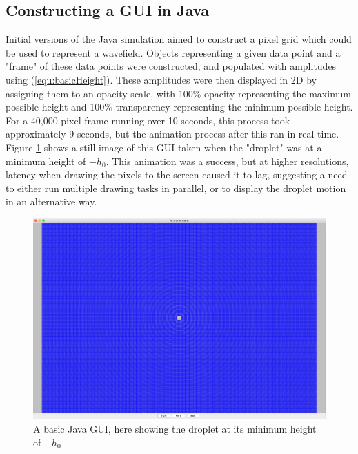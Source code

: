 \subsection{Constructing a GUI in Java}
Initial versions of the Java simulation aimed to construct a pixel grid which could be used to represent a wavefield. Objects representing a given data point and a "frame" of these data points were constructed, and populated with amplitudes using (\ref{equ:basicHeight}). These amplitudes were then displayed in 2D by assigning them to an opacity scale, with 100\% opacity representing the maximum possible height and 100\% transparency representing the minimum possible height. For a 40,000 pixel frame running over 10 seconds, this process took approximately 9 seconds, but the animation process after this ran in real time. Figure \ref{fig:javaBasicHeight} shows a still image of this GUI taken when the "droplet" was at a minimum height of $-h_0$. This animation was a success, but at higher resolutions, latency when drawing the pixels to the screen caused it to lag, suggesting a need to either run multiple drawing tasks in parallel, or to display the droplet motion in an alternative way.

\begin{figure}
    \centering
    \includegraphics[width=\textwidth]{simulation/javaMaxHeight.png}
    \caption{A basic Java GUI, here showing the droplet at its minimum height of $-h_0$}
    \label{fig:javaBasicHeight}
\end{figure}

